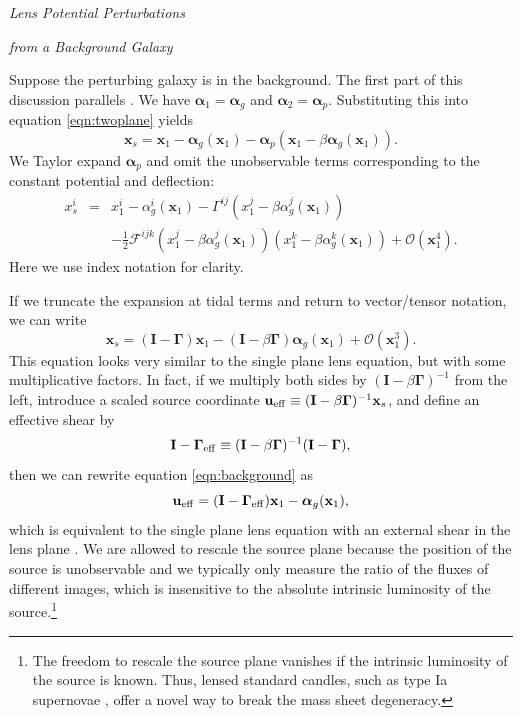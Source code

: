 \documentclass{emulateapj}
\newcommand\I[0]{\mathbf{I}}
\newcommand\GammaMat[0]{\boldsymbol{\Gamma}}
\newcommand\x[0]{\mathbf{x}}
\renewcommand\vec[1]{\mathbf{#1}}
\newcommand\al[0]{\boldsymbol{\alpha}}
\newcommand\sF{{\mathcal F}}
\begin{document}
\medskip
\centerline{\emph{Lens Potential Perturbations}}
\centerline{\emph{from a Background Galaxy}}
\medskip

Suppose the perturbing galaxy is in the background. The first part of this discussion parallels \citet{Keeton03}.  We have $\al_1 = \al_g$ and $\al_2 = \al_p$. Substituting this into equation \ref{eqn:twoplane} yields
\begin{equation}
\x_s = \x_1 - \al_g(\x_1) - \al_p(\x_1 - \beta \al_g(\x_1)). 
\end{equation}
We Taylor expand $\al_p$ and omit the unobservable terms corresponding to the constant potential and deflection:
\begin{eqnarray}
x^i_s &=& x^i_1 - \alpha^i_g(\x_1) - \Gamma^{ij} (x^j_1 - \beta \alpha^j_g(\x_1)) \\
&&- \frac{1}{2} \sF^{ijk} (x^j_1 - \beta \alpha^j_g(\x_1)) (x^k_1 - \beta \alpha^k_g(\x_1)) + \mathcal{O}(\x_1^4) . \nonumber
\end{eqnarray}
Here we use index notation for clarity.

If we truncate the expansion at tidal terms and return to vector/tensor notation, we can write
\begin{equation}
\label{eqn:background}
\x_s = (\I - \GammaMat) \x_1  - (\I - \beta \GammaMat)\al_g(\x_1) + \mathcal{O}(\x_1^3).
\end{equation}
This equation looks very similar to the single plane lens equation, but with some multiplicative factors. In fact, if we multiply both sides by $(\I - \beta \GammaMat)^{-1}$ from the left, introduce a scaled source coordinate $\vec{u}_{\rm eff} \equiv (\I - \beta \GammaMat)^{-1} \x_s$, and define an effective shear by
\begin{equation}\label{eqn:Geff}
\I -\GammaMat_{\rm eff} \equiv (\I - \beta\GammaMat)^{-1} (\I - \GammaMat) ,
\end{equation}
then we can rewrite equation \ref{eqn:background} as
\begin{equation}
\vec{u}_{\rm eff} = (\I - \GammaMat_{\rm eff}) \x_1 - \al_g(\x_1),
\end{equation}
which is equivalent to the single plane lens equation with an external shear in the lens plane \citep[see also][]{Schneider97}. We are allowed to rescale the source plane because the position of the source is unobservable and we typically only measure the ratio of the fluxes of different images, which is insensitive to the absolute intrinsic luminosity of the source.\footnote{The freedom to rescale the source plane vanishes if the intrinsic luminosity of the source is known.  Thus, lensed standard candles, such as type Ia supernovae \citep{Kelly16, Rodney16, Kelly15, Patel14, Kolatt98}, offer a novel way to break the mass sheet degeneracy.}
\end{document}
